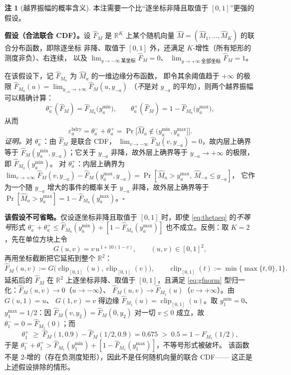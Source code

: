 \documentclass[a4paper,11pt]{article}
\theoremstyle{definition}
\newtheorem{remark}{注}
\newcommand{\R}{\mathbb R}
\newcommand{\1}{\mathbf 1}
\newcommand{\clipz}{\operatorname{clip}_{[0,1]}}
\begin{document}
\begin{remark}[越界振幅的概率含义]
\label{rem:thetamass}
本注需要一个比“逐坐标非降且取值于 $[0,1]$”更强的假设。

\textbf{假设（合法联合 CDF）。}设 $\widehat F_M$ 是 $\R^K$ 上某个随机向量
$\widehat M=(\widehat M_1,\ldots,\widehat M_K)$ 的联合分布函数，即除逐坐标
非降、取值于 $[0,1]$ 外，还满足 $K$-增性（所有矩形的测度非负）、右连续，
以及 $\lim_{y\to-\infty\ \text{某坐标}}\widehat F_M=0$、
$\lim_{y\to+\infty\ \text{全部坐标}}\widehat F_M=1$。

在该假设下，记 $\widehat F_{M_a}$ 为 $\widehat M_a$ 的一维边缘分布函数，
即令其余阈值趋于 $+\infty$ 的极限
$\widehat F_{M_a}(u)=\lim_{y_{-a}\to+\infty}\widehat F_M(u,y_{-a})$
（\emph{不}是对 $y_{-a}$ 的平均），则两个越界振幅可以精确计算：
\begin{equation}
\label{eq:thetaeq}
\theta_a^-(\widehat F_M)=\widehat F_{M_a}\bigl(y_a^{\min}\bigr),
\qquad
\theta_a^+(\widehat F_M)=1-\widehat F_{M_a}\bigl(y_a^{\max}\bigr),
\end{equation}
从而
\[
\varepsilon_a^{\mathrm{bdry}}
=\theta_a^-+\theta_a^+
=\Pr\bigl[\widehat M_a\notin(y_a^{\min},y_a^{\max}]\bigr] .
\]
\emph{证明。}对 $\theta_a^-$：由 $\widehat F_M$ 是联合 CDF，
$\lim_{v\to-\infty}\widehat F_M(v,y_{-a})=0$，故内层上确界等于
$\widehat F_M(y_a^{\min},y_{-a})$；它关于 $y_{-a}$ 非降，故外层上确界等于
$y_{-a}\to+\infty$ 的极限，即 $\widehat F_{M_a}(y_a^{\min})$。
对 $\theta_a^+$：内层上确界为
$\lim_{v\to+\infty}\widehat F_M(v,y_{-a})-\widehat F_M(y_a^{\max},y_{-a})
=\Pr[\widehat M_a>y_a^{\max},\,\widehat M_{-a}\le y_{-a}]$，
它作为一个随 $y_{-a}$ 增大的事件的概率关于 $y_{-a}$ 非降，故外层上确界等于
$\Pr[\widehat M_a>y_a^{\max}]=1-\widehat F_{M_a}(y_a^{\max})$。\hfill$\square$

\textbf{该假设不可省略。}仅设逐坐标非降且取值于 $[0,1]$ 时，即使
\eqref{eq:thetaeq} 的\emph{不等号}形式
$\theta_a^-+\theta_a^+\le\widehat F_{M_a}(y_a^{\min})
+[1-\widehat F_{M_a}(y_a^{\max})]$ 也不成立。反例：取 $K=2$，先在单位方块上令
\[
G(u,v)=v\,u^{\,1+10(1-v)},\qquad (u,v)\in[0,1]^2 ,
\]
再用坐标截断把它延拓到整个 $\R^2$：
\[
\widehat F_M(u,v):=G\bigl(\clipz(u),\clipz(v)\bigr),
\qquad \clipz(t):=\min\{\max\{t,0\},1\} .
\]
延拓后的 $\widehat F_M$ 在 $\R^2$ 上逐坐标非降、取值于 $[0,1]$，且满足
\eqref{eq:gfnorm} 型归一化：$\widehat F_M(u,v)\to0$（$u\to-\infty$）、
$\widehat F_M(u,v)\to\widehat F_{M_1}(u)$（$v\to+\infty$）。由 $G(u,1)=u$、
$G(1,v)=v$ 得边缘 $\widehat F_{M_1}(u)=\clipz(u)$。取
$y_1^{\min}=0$、$y_1^{\max}=1/2$：因 $\widehat F_M(v,y_2)=\widehat F_M(0,y_2)$
对一切 $v\le0$ 成立，故 $\theta_1^-=0=\widehat F_{M_1}(0)$；而
\[
\theta_1^+\;\ge\;\widehat F_M(1,0.9)-\widehat F_M(1/2,0.9)=0.675
\;>\;0.5=1-\widehat F_{M_1}(1/2) ,
\]
于是 $\theta_1^-+\theta_1^+>\widehat F_{M_1}(y_1^{\min})
+[1-\widehat F_{M_1}(y_1^{\max})]$，不等号形式被破坏。
该函数不是 $2$-增的（存在负测度矩形），因此不是任何随机向量的联合 CDF——
这正是上述假设排除的情形。


\end{remark}
\end{document}
